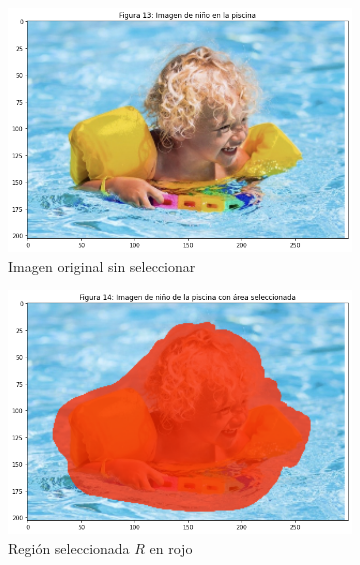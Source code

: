 \documentclass[11pt,twoside,titlepage,a4paper]{article}
\numberwithin{equation}{section} %
\theoremstyle{usual}
\begin{document}
\begin{figure}[h]
    \centering
    \begin{subfigure}[t]{0.25\textwidth}
        \includegraphics[width=\textwidth]{imagenes/PoissonImageEditing_cell_23_output_1.png}
        \caption{Imagen original sin seleccionar}
    \end{subfigure}
    \begin{subfigure}[t]{0.25\textwidth}
        \includegraphics[width=\textwidth]{imagenes/PoissonImageEditing_cell_23_output_2.png}
        \caption{Región seleccionada $R$ en rojo}
    \end{subfigure}
    \begin{subfigure}[t]{0.25\textwidth}
       \centering

\end{subfigure}
\end{figure}
\end{document}
